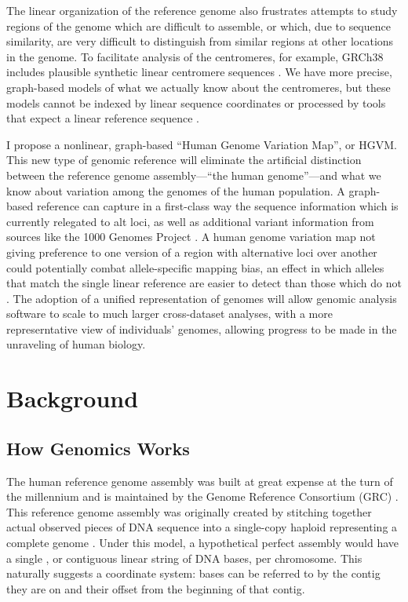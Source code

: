 The linear organization of the reference genome also frustrates attempts to study regions of the genome which are difficult to assemble, or which, due to sequence similarity, are very difficult to distinguish from similar regions at other locations in the genome. To facilitate analysis of the centromeres, for example, GRCh38 includes plausible synthetic linear centromere sequences \cite{karolchik2014new}. We have more precise, graph-based models of what we actually know about the centromeres, but these models cannot be indexed by linear sequence coordinates or processed by tools that expect a linear reference sequence \cite{miga2014centromere}.

I propose a nonlinear, graph-based ``Human Genome Variation Map'', or HGVM. This new type of genomic reference will eliminate the artificial distinction between the reference genome assembly---``the human genome''---and what we know about variation among the genomes of the human population. A graph-based reference can capture in a first-class way the sequence information which is currently relegated to alt loci, as well as additional variant information from sources like the 1000 Genomes Project \cite{10002015global}. A human genome variation map not giving preference to one version of a region with alternative loci over another could potentially combat allele-specific mapping bias, an effect in which alleles that match the single linear reference are easier to detect than those which do not \cite{degner2009effect}. The adoption of a unified representation of genomes will allow genomic analysis software to scale to much larger cross-dataset analyses, with a more represerntative view of individuals' genomes, allowing progress to be made in the unraveling of human biology.

\section{Background}

\subsection{How Genomics Works}

The human reference genome assembly was built at great expense at the turn of the millennium and is maintained by the Genome Reference Consortium (GRC) \cite{church2011modernizing}. This reference genome assembly was originally created by stitching together actual observed pieces of DNA sequence into a single-copy haploid  representing a complete genome \cite{church2011modernizing}. Under this model, a hypothetical perfect assembly would have a single , or contiguous linear string of DNA bases, per chromosome. This naturally suggests a coordinate system: bases can be referred to by the contig they are on and their offset from the beginning of that contig.

